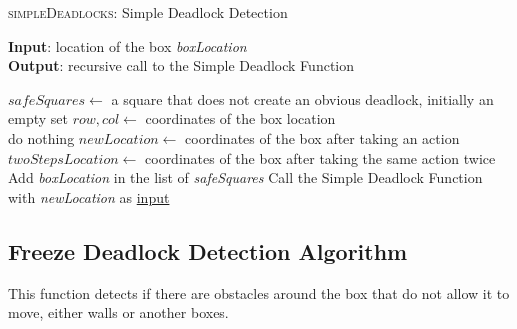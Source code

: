 \documentclass{article}
\begin{document}
\begin{algorithm}
    \caption{\textsc{simpleDeadlocks}: Simple Deadlock Detection}\label{euclid}
    \hspace*{\algorithmicindent} \textbf{Input}: location of the box \emph{boxLocation} \\
    \hspace*{\algorithmicindent} \textbf{Output}: recursive call to the Simple Deadlock Function \\
    \begin{algorithmic}
    \State $safeSquares \gets$ a square that does not create an obvious deadlock, initially an empty set
    \State $row, col \gets$ coordinates of the box location \\
        \State do nothing
    \EndIf 
        \State $newLocation \gets$ coordinates of the box after taking an action 
        \State $twoStepsLocation \gets$ coordinates of the box after taking the same action twice \\
            \State Add \emph{boxLocation} in the list of \emph{safeSquares} %
            \State Call the Simple Deadlock Function with \emph{newLocation} as \underline{input}
        \EndIf
    \EndFor
    \end{algorithmic}
\end{algorithm}


\subsection{Freeze Deadlock Detection Algorithm}

This function detects if there are obstacles around the box that do not allow it to move, either walls or another boxes.
\end{document}
